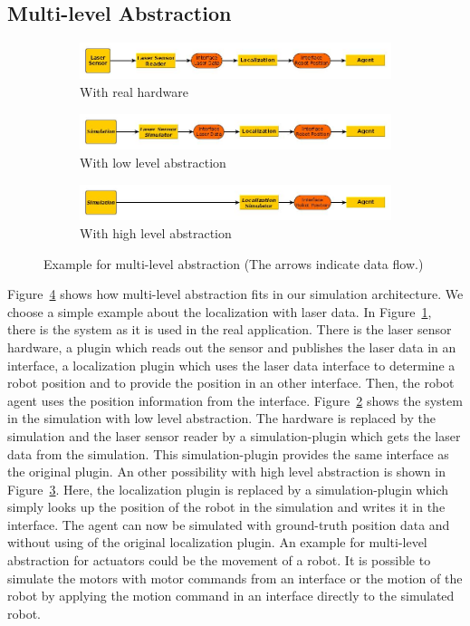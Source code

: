 \subsection{Multi-level Abstraction}
\label{sec:architecture_mla}
\begin{figure}
\centering
\begin{subfigure}[b]{\textwidth}
\includegraphics[width=\textwidth]{tabs/mla_hardware}
\caption{With real hardware}
\label{fig:mla_hardware}
\end{subfigure}
\begin{subfigure}[b]{\textwidth}
\includegraphics[width=\textwidth]{tabs/mla_sim_low}
\caption{With low level abstraction}
\label{fig:mla_sim_low}
\end{subfigure}
\begin{subfigure}[b]{\textwidth}
\includegraphics[width=\textwidth]{tabs/mla_sim_high}
\caption{With high level abstraction}
\label{fig:mla_sim_high}
\end{subfigure}
\caption{Example for multi-level abstraction (The arrows indicate data flow.)}
\label{fig:mla}
\end{figure}
Figure~\ref{fig:mla} shows how multi-level abstraction fits in our simulation architecture. We choose a simple example about the localization with laser data. In Figure~\ref{fig:mla_hardware}, there is the system as it is used in the real application. There is the laser sensor hardware, a plugin which reads out the sensor and publishes the laser data in an interface, a localization plugin which uses the laser data interface to determine a robot position and to provide the position in an other interface. Then, the robot agent uses the position information from the interface. Figure~\ref{fig:mla_sim_low} shows the system in the simulation with low level abstraction. The hardware is replaced by the simulation and the laser sensor reader by a simulation-plugin which gets the laser data from the simulation. This simulation-plugin provides the same interface as the original plugin. An other possibility with high level abstraction is shown in Figure~\ref{fig:mla_sim_high}. Here, the localization plugin is replaced by a simulation-plugin which simply looks up the position of the robot in the simulation and writes it in the interface. The agent can now be simulated with ground-truth position data and without using of the original localization plugin. An example for multi-level abstraction for actuators could be the movement of a robot. It is possible to simulate the motors with motor commands from an interface or the motion of the robot by applying the motion command in an interface directly to the simulated robot.

